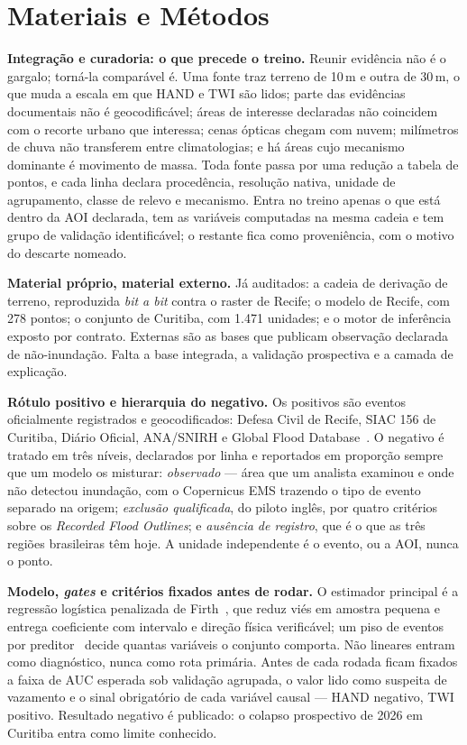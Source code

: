 \documentclass[conference]{IEEEtran}
\begin{document}
\section{Materiais e Métodos}

\textbf{Integração e curadoria: o que precede o treino.} Reunir evidência não é o
gargalo; torná-la comparável é. Uma fonte traz terreno de 10\,m e outra de 30\,m,
o que muda a escala em que HAND e TWI são lidos; parte das evidências documentais
não é geocodificável; áreas de interesse declaradas não coincidem com o recorte
urbano que interessa; cenas ópticas chegam com nuvem; milímetros de chuva não
transferem entre climatologias; e há áreas cujo mecanismo dominante é movimento
de massa. Toda fonte passa por uma
redução a tabela de pontos, e cada linha declara procedência, resolução nativa,
unidade de agrupamento, classe de relevo e mecanismo. Entra no treino apenas o
que está dentro da AOI declarada, tem as variáveis computadas na mesma cadeia e
tem grupo de validação identificável; o restante fica como proveniência, com o
motivo do descarte nomeado.

\textbf{Material próprio, material externo.} Já auditados: a cadeia de derivação
de terreno, reproduzida \emph{bit a bit} contra o raster de Recife; o modelo de
Recife, com 278 pontos; o conjunto de Curitiba, com 1.471 unidades; e o motor de
inferência exposto por contrato. Externas são as bases que publicam observação
declarada de não-inundação. Falta a base integrada, a validação prospectiva e a
camada de explicação.

\textbf{Rótulo positivo e hierarquia do negativo.} Os positivos são eventos
oficialmente registrados e geocodificados: Defesa Civil de Recife, SIAC 156 de
Curitiba, Diário Oficial, ANA/SNIRH e Global Flood Database~\cite{tellman2021}. O
negativo é tratado em três níveis, declarados por linha e reportados em proporção
sempre que um modelo os misturar: \emph{observado} --- área que um analista
examinou e onde não detectou inundação, com o Copernicus EMS trazendo o tipo de
evento separado na origem; \emph{exclusão qualificada}, do piloto inglês, por
quatro critérios sobre os \emph{Recorded Flood Outlines}; e \emph{ausência de
registro}, que é o que as três regiões brasileiras têm hoje. A unidade
independente é o evento, ou a AOI, nunca o ponto.

\textbf{Modelo, \emph{gates} e critérios fixados antes de rodar.} O estimador
principal é a regressão logística penalizada de Firth~\cite{firth1993}, que reduz
viés em amostra pequena e entrega coeficiente com intervalo e direção física
verificável; um piso de eventos por preditor~\cite{peduzzi1996} decide quantas
variáveis o conjunto comporta. Não lineares entram como diagnóstico, nunca como
rota primária. Antes de cada rodada ficam fixados a faixa de AUC esperada sob
validação agrupada, o valor lido como suspeita de vazamento e o sinal obrigatório
de cada variável causal --- HAND negativo, TWI positivo. Resultado negativo é
publicado: o colapso prospectivo de 2026 em Curitiba entra como limite
conhecido.
\end{document}
